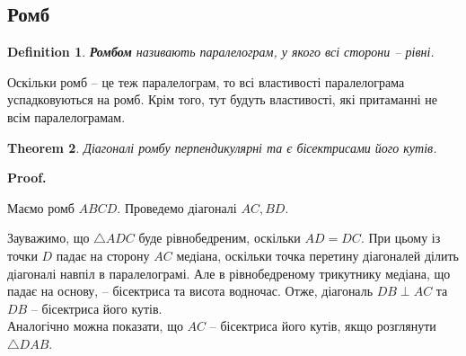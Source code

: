 \documentclass[a4paper, 10pt]{article}
\makeatletter
\theoremstyle{theoremdd}
\newtheorem{theorem}{Theorem}[subsection]
\theoremstyle{theoremdd}
\theoremstyle{theoremdd}
\newtheorem{definition}[theorem]{Definition}
\theoremstyle{theoremdd}
\theoremstyle{theoremdd}
\theoremstyle{theoremdd}
\theoremstyle{theoremdd}
\theoremstyle{theoremdd}
\theoremstyle{theoremdd}
\renewenvironment{proof}[1][Proof.\\]{\par
\pushQED{\hfill \qed}%
\normalfont \topsep6\p@\@plus6\p@\relax
\trivlist
\item\relax
{\bfseries
#1\@addpunct{.}}\hspace\labelsep\ignorespaces
}{%
\popQED\endtrivlist\@endpefalse
}
\makeatother
\begin{document}
\subsection{Ромб}
\begin{definition}
\textbf{Ромбом} називають паралелограм, у якого всі сторони -- рівні.
\begin{figure}[H]
\centering
{}
\end{figure}
\end{definition}

Оскільки ромб -- це теж паралелограм, то всі властивості паралелограма успадковуються на ромб. Крім того, тут будуть властивості, які притаманні не всім паралелограмам.

\begin{theorem}
Діагоналі ромбу перпендикулярні та є бісектрисами його кутів.
\end{theorem}

\begin{proof}
Маємо ромб $ABCD$. Проведемо діагоналі $AC,BD$.
\begin{figure}[H]
\centering
{}
\end{figure}
Зауважимо, що $\triangle ADC$ буде рівнобедреним, оскільки $AD = DC$. При цьому із точки $D$ падає на сторону $AC$ медіана, оскільки точка перетину діагоналей ділить діагоналі навпіл в паралелограмі. Але в рівнобедреному трикутнику медіана, що падає на основу, -- бісектриса та висота водночас. Отже, діагональ $DB \perp AC$ та $DB$ -- бісектриса його кутів.\\
Аналогічно можна показати, що $AC$ -- бісектриса його кутів, якщо розглянути $\triangle DAB$.
\end{proof}
\end{document}
